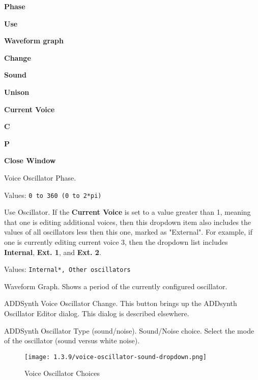    \begin{enumber}
      \item \textbf{Phase}
      \item \textbf{Use}
      \item \textbf{Waveform graph}
      \item \textbf{Change}
      \item \textbf{Sound}
      \item \textbf{Unison}
      \item \textbf{Current Voice}
      \item \textbf{C}
      \item \textbf{P}
      \item \textbf{Close Window}
   \end{enumber}

   \setcounter{ItemCounter}{0}      %

   Voice Oscillator Phase.

   Values: \texttt{0 to 360 (0 to 2*pi)}

   Use Oscillator.
   If the \textbf{Current Voice} is set to a value greater than 1, meaning
   that one is editing additional voices, then this dropdown item also
   includes the values of all oscillators less then this one, marked as
   "External".  For example, if one is currently editing current voice 3,
   then the dropdown list includes \textbf{Internal}, \textbf{Ext. 1}, and
   \textbf{Ext. 2}.

   Values: \texttt{Internal*, Other oscillators}

   Waveform Graph.
   Shows a period of the currently configured oscillator.

   ADDSynth Voice Oscillator Change.
   This button brings up the ADDsynth Oscillator Editor dialog.
   This dialog is described elsewhere.

   ADDSynth Oscillator Type (sound/noise).
   Sound/Noise choice.
   Select the mode of the oscillator (sound versus white noise).

\begin{figure}[H]
   \centering 
   \texttt{[image: 1.3.9/voice-oscillator-sound-dropdown.png]}
   \caption{Voice Oscillator Choices}
   \label{fig:voice_oscillator_choices}
\end{figure}

